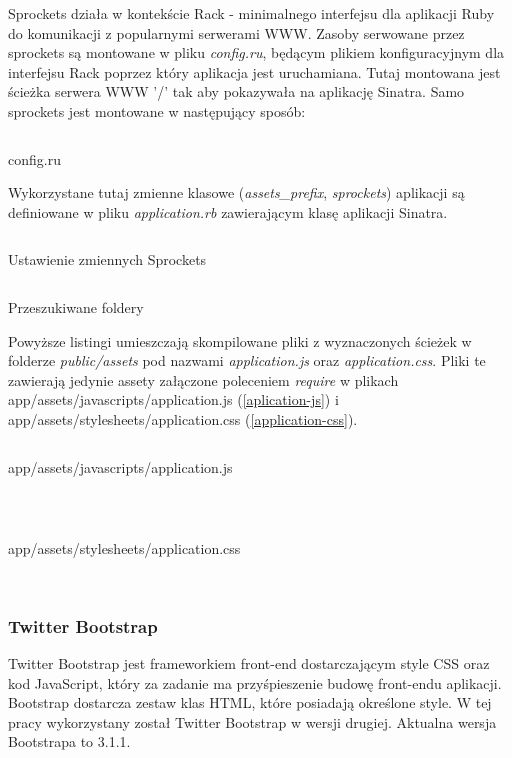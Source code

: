 \documentclass[11pt,a4paper, twoside]{article}
\begin{document}
Sprockets działa w kontekście Rack - minimalnego interfejsu dla aplikacji Ruby do komunikacji z popularnymi serwerami WWW. Zasoby serwowane przez sprockets są montowane w pliku \emph{config.ru}, będącym plikiem konfiguracyjnym dla interfejsu Rack poprzez który aplikacja jest uruchamiana. Tutaj  montowana jest ścieżka serwera WWW '/' tak aby pokazywała na aplikację Sinatra. 
\noindent
Samo sprockets jest montowane w następujący sposób:
\begin{listing}[H]
\inputminted[linenos=true]{ruby}{./src/sprockets_mount.rb}
\caption{config.ru}
\end{listing}
\noindent
Wykorzystane tutaj zmienne klasowe (\emph{assets\_prefix}, \emph{sprockets}) aplikacji są definiowane w pliku \emph{application.rb} zawierającym klasę aplikacji Sinatra.
\begin{listing}[H]
\inputminted[linenos=true]{ruby}{./src/sprockets_config.rb}
\caption{Ustawienie zmiennych Sprockets}
\end{listing}
\noindent
\begin{listing}[H]
\inputminted[linenos=true]{ruby}{./src/sprockets_asset_paths.rb}
\caption{Przeszukiwane foldery}
\end{listing}
\noindent
Powyższe listingi umieszczają skompilowane pliki z wyznaczonych ścieżek w folderze \emph{public/assets} pod nazwami \emph{application.js} oraz \emph{application.css}. Pliki te zawierają jedynie assety załączone poleceniem \emph{require} w plikach app/assets/javascripts/application.js (\ref{aplication-js}) i \newline app/assets/stylesheets/application.css (\ref{application-css}).
\begin{listing}[H]
\inputminted[linenos=true]{javascript}{./src/application.js}
\caption{app/assets/javascripts/application.js}
$\label{aplication-js}$
\end{listing}
\begin{listing}[H]
\inputminted[linenos=true]{javascript}{./src/application.css}
\caption{app/assets/stylesheets/application.css}
$\label{application-css}$
\end{listing}
\subsubsection{Twitter Bootstrap}
Twitter Bootstrap jest frameworkiem front-end dostarczającym style CSS oraz kod JavaScript, który za zadanie ma przyśpieszenie budowę front-endu aplikacji. Bootstrap dostarcza zestaw klas HTML, które posiadają określone style. W tej pracy wykorzystany został Twitter Bootstrap w wersji drugiej. Aktualna wersja Bootstrapa to 3.1.1.
\end{document}

